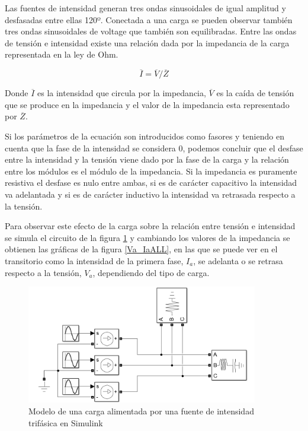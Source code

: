 \documentclass{book}
\begin{document}
Las fuentes de intensidad generan tres ondas sinusoidales de igual amplitud y desfasadas entre ellas 120º. Conectada a una carga se pueden observar tambi\'en tres ondas sinusoidales de voltage que tambi\'en son equilibradas. Entre las ondas de tensi\'on e intensidad existe una relaci\'on dada por la impedancia de la carga representada en la ley de Ohm. \par

\begin{equation}\label{eq:ohm}
	\overline{I}=\overline{V}/\overline{Z}
\end{equation} \par

Donde $\overline{I}$ es la intensidad que circula por la impedancia, $\overline{V}$ es la ca\'ida de tensi\'on que se produce en la impedancia y el valor de la impedancia esta representado por $\overline{Z}$. \par

Si los par\'ametros de la ecuaci\'on son introducidos como fasores y teniendo en cuenta que la fase de la intensidad se considera 0, podemos concluir que el desfase entre la intensidad y la tensi\'on viene dado por la fase de la carga y la relaci\'on entre los m\'odulos es el m\'odulo de la impedancia. Si la impedancia es puramente resistiva el desfase es nulo entre ambas, si es de car\'acter capacitivo la intensidad va adelantada y si es de car\'acter inductivo la intensidad va retrasada respecto a la tensi\'on. \par

Para observar este efecto de la carga sobre la relaci\'on entre tensi\'on e intensidad se simula el circuito de la figura \ref{LoadAnalyserModel} y cambiando los valores de la impedancia se obtienen las gr\'aficas de la figura \ref {Va_IaALL}, en las que se puede ver en el transitorio como la intensidad de la primera fase, $I_a$,  se adelanta o se retrasa respecto a la tensi\'on, $V_a$, dependiendo del tipo de carga.  \par

\begin{figure}[h!]
\centering
\includegraphics[width=0.9\textwidth]{LoadAnalyserModel.PNG}
\caption{Modelo de una carga alimentada por una fuente de intensidad trif\'asica en Simulink}
\label{LoadAnalyserModel}
\end{figure}
\end{document}
